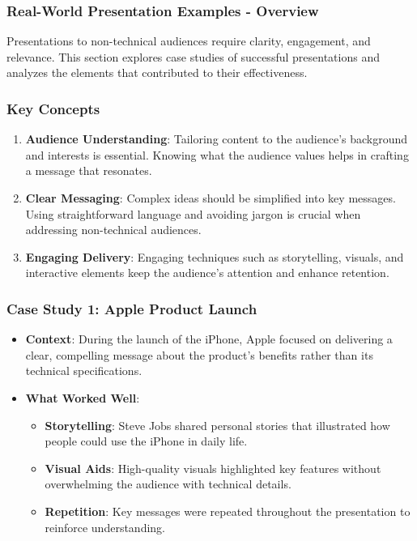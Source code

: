 \documentclass[aspectratio=169]{beamer}
\begin{document}
\begin{frame}[fragile]
    \frametitle{Real-World Presentation Examples - Overview}
    Presentations to non-technical audiences require clarity, engagement, and relevance. 
    This section explores case studies of successful presentations and analyzes the elements that contributed to their effectiveness.
\end{frame}

\begin{frame}[fragile]
    \frametitle{Key Concepts}
    \begin{enumerate}
        \item \textbf{Audience Understanding}: Tailoring content to the audience's background and interests is essential. Knowing what the audience values helps in crafting a message that resonates.
        
        \item \textbf{Clear Messaging}: Complex ideas should be simplified into key messages. Using straightforward language and avoiding jargon is crucial when addressing non-technical audiences.
        
        \item \textbf{Engaging Delivery}: Engaging techniques such as storytelling, visuals, and interactive elements keep the audience's attention and enhance retention.
    \end{enumerate}
\end{frame}

\begin{frame}[fragile]
    \frametitle{Case Study 1: Apple Product Launch}
    \begin{itemize}
        \item \textbf{Context}: During the launch of the iPhone, Apple focused on delivering a clear, compelling message about the product's benefits rather than its technical specifications.
        \item \textbf{What Worked Well}:
        \begin{itemize}
            \item \textbf{Storytelling}: Steve Jobs shared personal stories that illustrated how people could use the iPhone in daily life.
            \item \textbf{Visual Aids}: High-quality visuals highlighted key features without overwhelming the audience with technical details.
            \item \textbf{Repetition}: Key messages were repeated throughout the presentation to reinforce understanding.
        \end{itemize}
    \end{itemize}
\end{frame}
\end{document}
